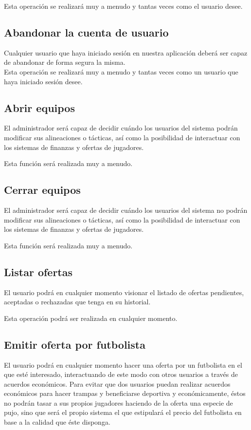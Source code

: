 Esta operación se realizará muy a menudo y tantas veces como el usuario desee.
\subsection{Abandonar la cuenta de usuario}
Cualquier usuario que haya iniciado sesión en nuestra aplicación
deberá ser capaz de abandonar de forma segura la misma.\\

Esta operación se realizará muy a menudo y tantas veces como un usuario que haya
iniciado sesión desee.

\subsection{Abrir equipos}
El administrador será capaz de decidir cuándo los usuarios del sistema podrán
modificar sus alineaciones o tácticas, así como la posibilidad de interactuar
con los sistemas de finanzas y ofertas de jugadores.

Esta función será realizada muy a menudo.

\subsection{Cerrar equipos}
El administrador será capaz de decidir cuándo los usuarios del sistema no podrán
modificar sus alineaciones o tácticas, así como la posibilidad de interactuar
con los sistemas de finanzas y ofertas de jugadores.

Esta función será realizada muy a menudo.

\subsection{Listar ofertas}
El usuario podrá en cualquier momento visionar el listado de ofertas pendientes,
aceptadas o rechazadas que tenga en su historial.

Esta operación podrá ser realizada en cualquier momento.

\subsection{Emitir oferta por futbolista}
El usuario podrá en cualquier momento hacer una oferta por un futbolista en el
que esté interesado, interactuando de este modo con otros usuarios a través de
acuerdos económicos. Para evitar que dos usuarios puedan realizar acuerdos
económicos para hacer trampas y beneficiarse deportiva y económicamente, éstos
no podrán tasar a sus propios jugadores haciendo de la oferta una especie de
pujo, sino que será el propio sistema el que estipulará el precio del futbolista
en base a la calidad que éste disponga.

